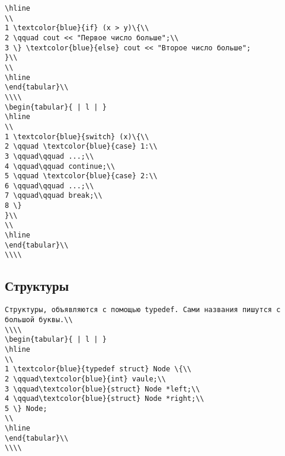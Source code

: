 \documentclass{article}
\begin{document}
\begin{lstlisting}
\hline
\\
1 \textcolor{blue}{if} (x > y)\{\\
2 \qquad cout << "Первое число больше";\\
3 \} \textcolor{blue}{else} cout << "Второе число больше";
}\\
\\
\hline
\end{tabular}\\
\\\\
\begin{tabular}{ | l | }
\hline
\\
1 \textcolor{blue}{switch} (x)\{\\
2 \qquad \textcolor{blue}{case} 1:\\
3 \qquad\qquad ...;\\
4 \qquad\qquad continue;\\
5 \qquad \textcolor{blue}{case} 2:\\
6 \qquad\qquad ...;\\
7 \qquad\qquad break;\\
8 \} 
}\\
\\
\hline
\end{tabular}\\
\\\\
\end{lstlisting}

\subsection{Структуры}
\begin{lstlisting}
Cтруктуры, объявляются с помощью typedef. Сами названия пишутся с большой буквы.\\
\\\\
\begin{tabular}{ | l | }
\hline
\\
1 \textcolor{blue}{typedef struct} Node \{\\
2 \qquad\textcolor{blue}{int} vaule;\\
3 \qquad\textcolor{blue}{struct} Node *left;\\
4 \qquad\textcolor{blue}{struct} Node *right;\\
5 \} Node;
\\
\hline
\end{tabular}\\
\\\\
\end{lstlisting}
\end{document}
